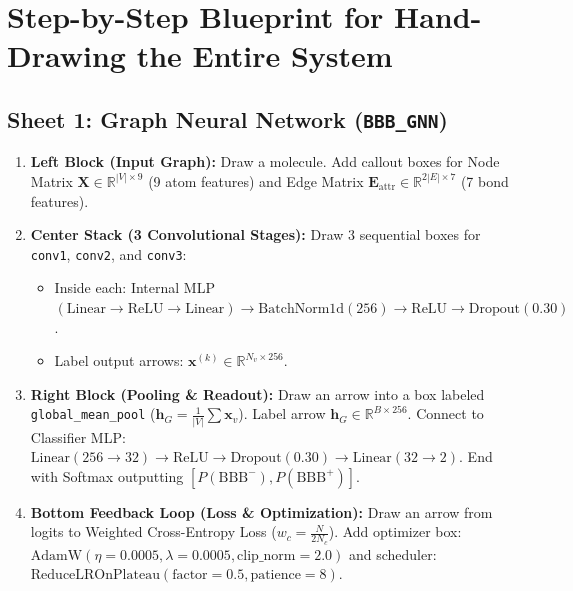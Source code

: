 \documentclass[11pt,a4paper]{article}
\begin{document}
\newpage
\section{Step-by-Step Blueprint for Hand-Drawing the Entire System}

\subsection{Sheet 1: Graph Neural Network (\texttt{BBB\_GNN})}
\begin{enumerate}[leftmargin=*]
    \item \textbf{Left Block (Input Graph):}
    Draw a molecule. Add callout boxes for Node Matrix $\mathbf{X} \in \mathbb{R}^{|V| \times 9}$ (9 atom features) and Edge Matrix $\mathbf{E}_{\text{attr}} \in \mathbb{R}^{2|E| \times 7}$ (7 bond features).
    \item \textbf{Center Stack (3 Convolutional Stages):}
    Draw 3 sequential boxes for \texttt{conv1}, \texttt{conv2}, and \texttt{conv3}:
    \begin{itemize}
        \item Inside each: Internal MLP $(\text{Linear} \to \text{ReLU} \to \text{Linear}) \to \text{BatchNorm1d}(256) \to \text{ReLU} \to \text{Dropout}(0.30)$.
        \item Label output arrows: $\mathbf{x}^{(k)} \in \mathbb{R}^{N_v \times 256}$.
    \end{itemize}
    \item \textbf{Right Block (Pooling \& Readout):}
    Draw an arrow into a box labeled \texttt{global\_mean\_pool} ($\mathbf{h}_G = \frac{1}{|V|} \sum \mathbf{x}_v$). Label arrow $\mathbf{h}_G \in \mathbb{R}^{B \times 256}$. Connect to Classifier MLP: $\text{Linear}(256 \to 32) \to \text{ReLU} \to \text{Dropout}(0.30) \to \text{Linear}(32 \to 2)$. End with Softmax outputting $[P(\text{BBB}^-), P(\text{BBB}^+)]$.
    \item \textbf{Bottom Feedback Loop (Loss \& Optimization):}
    Draw an arrow from logits to Weighted Cross-Entropy Loss ($w_c = \frac{N}{2 N_c}$). Add optimizer box: $\text{AdamW}(\eta=0.0005, \lambda=0.0005, \text{clip\_norm}=2.0)$ and scheduler: $\text{ReduceLROnPlateau}(\text{factor}=0.5, \text{patience}=8)$.
\end{enumerate}
\end{document}
